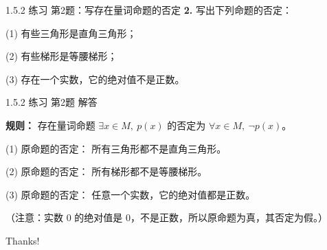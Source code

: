 \documentclass[10pt,aspectratio=169,serif]{beamer}
\begin{document}
\begin{frame}[t]{1.5.2 练习 第2题：写存在量词命题的否定}
\textbf{2.} 写出下列命题的否定：

\vspace{0.5em}
(1) 有些三角形是直角三角形；

\vspace{0.3em}
(2) 有些梯形是等腰梯形；

\vspace{0.3em}
(3) 存在一个实数，它的绝对值不是正数。
\end{frame}

\begin{frame}[t]{1.5.2 练习 第2题 解答}
\begin{tcolorbox}[colback=orange!10,colframe=orange,title=\textbf{解}]
\textbf{规则：} 存在量词命题 $\exists x \in M,\ p(x)$ 的否定为 $\forall x \in M,\ \neg p(x)$。

\vspace{0.8em}
(1) 原命题的否定：
所有三角形都不是直角三角形。

\vspace{0.5em}
(2) 原命题的否定：
所有梯形都不是等腰梯形。

\vspace{0.5em}
(3) 原命题的否定：
任意一个实数，它的绝对值都是正数。

\vspace{0.3em}
\small（注意：实数 $0$ 的绝对值是 $0$，不是正数，所以原命题为真，其否定为假。）
\end{tcolorbox}
\end{frame}

\begin{frame}[c]
  \begin{center}
    {\Huge\calligra Thanks!}
  \end{center}
\end{frame}
\end{document}
